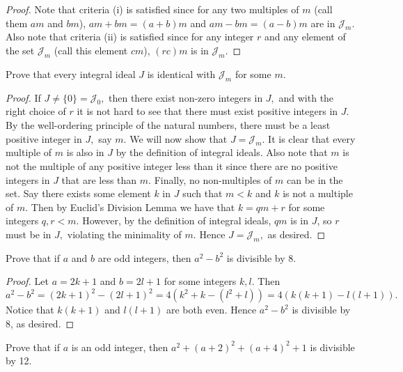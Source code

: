 \documentclass[letterpaper,oneside]{scrartcl}
\begin{document}
\begin{proof}
  Note that criteria (i) is satisfied since for any two multiples of \(m\) (call them \(am\) and \(bm\)), \(am+bm=(a+b)m\) and \(am-bm=(a-b)m\) are in \(\mathcal{J}_m.\)
  Also note that criteria (ii) is satisfied since for any integer \(r\) and any element of the set \(\mathcal{J}_m\) (call this element \(cm\)), \((rc)m\) is in \(\mathcal{J}_m\).
\end{proof}
\newpage
\begin{problem*}
  Prove that every integral ideal \(J\) is identical with \(\mathcal{J}_m\) for some \(m.\)
\end{problem*}
\begin{proof}
  If \(J\neq\{0\}=\mathcal{J}_0,\) then there exist non-zero integers in \(J,\) and with the right choice of \(r\) it is not hard to see that there must exist positive integers in \(J.\)
  By the well-ordering principle of the natural numbers, there must be a least positive integer in \(J,\) say \(m.\) We will now show that \(J=\mathcal{J}_m.\)
  It is clear that every multiple of \(m\) is also in \(J\) by the definition of integral ideals. Also note that \(m\) is not the multiple of any positive integer less than it since there are no positive integers in \(J\) that are less than \(m.\)
  Finally, no non-multiples of \(m\) can be in the set. Say there exists some element \(k\) in \(J\) such that \(m<k\) and \(k\) is not a multiple of \(m.\) Then by Euclid's Division Lemma we have that \(k=qm+r\) for some integers \(q,r<m.\) However, by the definition of integral ideals, \(qm\) is in \(J\), so \(r\) must be in \(J,\) violating the minimality of \(m.\)
  Hence \(J=\mathcal{J}_m,\) as desired.
\end{proof}
\begin{problem*}
  Prove that if \(a\) and \(b\) are odd integers, then \(a^2-b^2\) is divisible by 8.
\end{problem*}
\begin{proof}
  Let \(a=2k+1\) and \(b=2l+1\) for some integers \(k,l.\) Then
  \[a^2-b^2=(2k+1)^2-(2l+1)^2=4(k^2+k-(l^2+l))=4(k(k+1)-l(l+1)).\]
  Notice that \(k(k+1)\) and \(l(l+1)\) are both even. Hence \(a^2-b^2\) is divisible by 8, as desired.
\end{proof}
\begin{problem*}
  Prove that if \(a\) is an odd integer, then \(a^2+(a+2)^2+(a+4)^2+1\) is divisible by 12.
\end{problem*}
\end{document}
